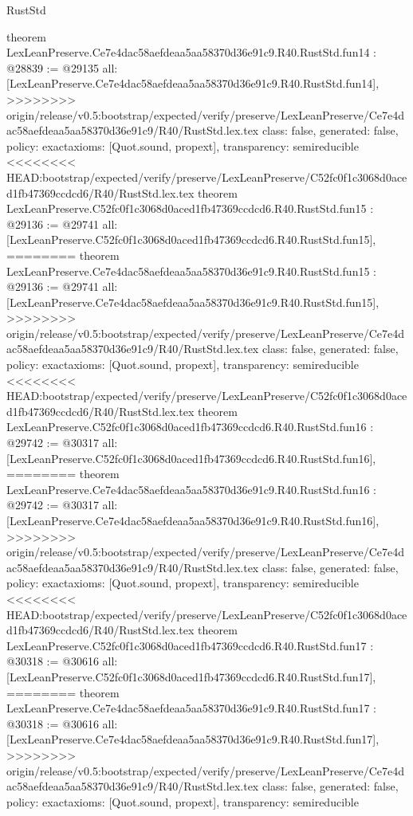 \begin{lexlean}{RustStd}
\begin{coremodule}
{\begin{coremodule}
{{{{{{{{{{{{{{{{{theorem LexLeanPreserve.Ce7e4dac58aefdeaa5aa58370d36e91c9.R40.RustStd.fun14 : @28839 := @29135 {
  all: [LexLeanPreserve.Ce7e4dac58aefdeaa5aa58370d36e91c9.R40.RustStd.fun14],
>>>>>>>> origin/release/v0.5:bootstrap/expected/verify/preserve/LexLeanPreserve/Ce7e4dac58aefdeaa5aa58370d36e91c9/R40/RustStd.lex.tex
  class: false,
  generated: false,
  policy: exact{axioms: [Quot.sound, propext]},
  transparency: semireducible
}
<<<<<<<< HEAD:bootstrap/expected/verify/preserve/LexLeanPreserve/C52fc0f1c3068d0aced1fb47369ccdcd6/R40/RustStd.lex.tex
theorem LexLeanPreserve.C52fc0f1c3068d0aced1fb47369ccdcd6.R40.RustStd.fun15 : @29136 := @29741 {
  all: [LexLeanPreserve.C52fc0f1c3068d0aced1fb47369ccdcd6.R40.RustStd.fun15],
========
theorem LexLeanPreserve.Ce7e4dac58aefdeaa5aa58370d36e91c9.R40.RustStd.fun15 : @29136 := @29741 {
  all: [LexLeanPreserve.Ce7e4dac58aefdeaa5aa58370d36e91c9.R40.RustStd.fun15],
>>>>>>>> origin/release/v0.5:bootstrap/expected/verify/preserve/LexLeanPreserve/Ce7e4dac58aefdeaa5aa58370d36e91c9/R40/RustStd.lex.tex
  class: false,
  generated: false,
  policy: exact{axioms: [Quot.sound, propext]},
  transparency: semireducible
}
<<<<<<<< HEAD:bootstrap/expected/verify/preserve/LexLeanPreserve/C52fc0f1c3068d0aced1fb47369ccdcd6/R40/RustStd.lex.tex
theorem LexLeanPreserve.C52fc0f1c3068d0aced1fb47369ccdcd6.R40.RustStd.fun16 : @29742 := @30317 {
  all: [LexLeanPreserve.C52fc0f1c3068d0aced1fb47369ccdcd6.R40.RustStd.fun16],
========
theorem LexLeanPreserve.Ce7e4dac58aefdeaa5aa58370d36e91c9.R40.RustStd.fun16 : @29742 := @30317 {
  all: [LexLeanPreserve.Ce7e4dac58aefdeaa5aa58370d36e91c9.R40.RustStd.fun16],
>>>>>>>> origin/release/v0.5:bootstrap/expected/verify/preserve/LexLeanPreserve/Ce7e4dac58aefdeaa5aa58370d36e91c9/R40/RustStd.lex.tex
  class: false,
  generated: false,
  policy: exact{axioms: [Quot.sound, propext]},
  transparency: semireducible
}
<<<<<<<< HEAD:bootstrap/expected/verify/preserve/LexLeanPreserve/C52fc0f1c3068d0aced1fb47369ccdcd6/R40/RustStd.lex.tex
theorem LexLeanPreserve.C52fc0f1c3068d0aced1fb47369ccdcd6.R40.RustStd.fun17 : @30318 := @30616 {
  all: [LexLeanPreserve.C52fc0f1c3068d0aced1fb47369ccdcd6.R40.RustStd.fun17],
========
theorem LexLeanPreserve.Ce7e4dac58aefdeaa5aa58370d36e91c9.R40.RustStd.fun17 : @30318 := @30616 {
  all: [LexLeanPreserve.Ce7e4dac58aefdeaa5aa58370d36e91c9.R40.RustStd.fun17],
>>>>>>>> origin/release/v0.5:bootstrap/expected/verify/preserve/LexLeanPreserve/Ce7e4dac58aefdeaa5aa58370d36e91c9/R40/RustStd.lex.tex
  class: false,
  generated: false,
  policy: exact{axioms: [Quot.sound, propext]},
  transparency: semireducible
}}}}}}}}}}}}}}}}}}}}}
\end{coremodule}}
\end{coremodule}
\end{lexlean}
